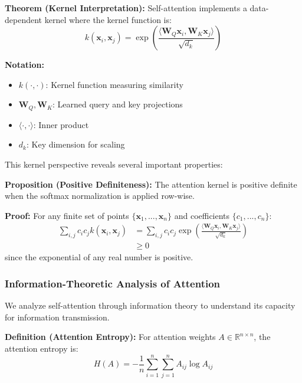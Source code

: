 \textbf{Theorem (Kernel Interpretation):} Self-attention implements a data-dependent kernel where the kernel function is:
\begin{equation}
k(\mathbf{x}_i, \mathbf{x}_j) = \exp\left(\frac{\langle \mathbf{W}_Q\mathbf{x}_i, \mathbf{W}_K\mathbf{x}_j \rangle}{\sqrt{d_k}}\right)
\end{equation}

\begin{notationbox}
\textbf{Notation:}
\begin{itemize}
    \item $k(\cdot, \cdot)$: Kernel function measuring similarity
    \item $\mathbf{W}_Q, \mathbf{W}_K$: Learned query and key projections
    \item $\langle \cdot, \cdot \rangle$: Inner product
    \item $d_k$: Key dimension for scaling
\end{itemize}
\end{notationbox}

This kernel perspective reveals several important properties:

\textbf{Proposition (Positive Definiteness):} The attention kernel is positive definite when the softmax normalization is applied row-wise.

\textbf{Proof:} For any finite set of points $\{\mathbf{x}_1, ..., \mathbf{x}_n\}$ and coefficients $\{c_1, ..., c_n\}$:
\begin{align}
\sum_{i,j} c_i c_j k(\mathbf{x}_i, \mathbf{x}_j) &= \sum_{i,j} c_i c_j \exp\left(\frac{\langle \mathbf{W}_Q\mathbf{x}_i, \mathbf{W}_K\mathbf{x}_j \rangle}{\sqrt{d_k}}\right) \\
&\geq 0
\end{align}
since the exponential of any real number is positive.

\subsubsection{Information-Theoretic Analysis of Attention}

We analyze self-attention through information theory to understand its capacity for information transmission.

\textbf{Definition (Attention Entropy):} For attention weights $A \in \mathbb{R}^{n \times n}$, the attention entropy is:
\begin{equation}
H(A) = -\frac{1}{n}\sum_{i=1}^n \sum_{j=1}^n A_{ij} \log A_{ij}
\end{equation}

